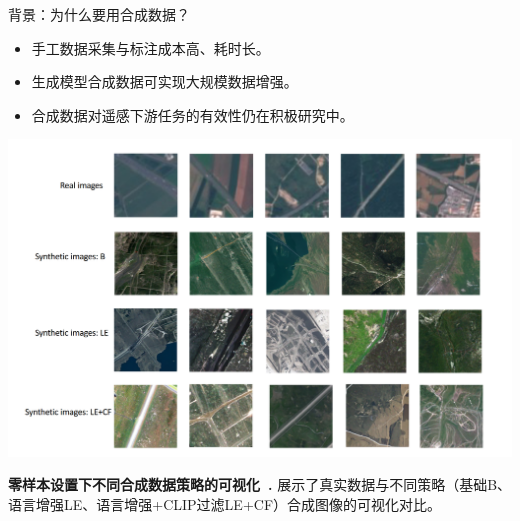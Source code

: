   
\begin{refsection}
  \begin{frame}{背景：为什么要用合成数据？}
    \begin{itemize}
      \item 手工数据采集与标注成本高、耗时长。
      \item 生成模型合成数据可实现大规模数据增强。
      \item 合成数据对遥感下游任务的有效性仍在积极研究中。
    \end{itemize}
    \begin{minipage}{0.5\linewidth}
      \includegraphics[width=\linewidth]{figs/Visualization_of_different_strategies_of_synthetic_data_in_zeroshot_settings.png}
    \end{minipage}%
    \hfill
    \begin{minipage}{0.4\linewidth}
      \vspace{0.5em}
      {\scriptsize
      \textbf{零样本设置下不同合成数据策略的可视化~\parencite{heSYNTHETICDATAGENERATIVE2022}.} 展示了真实数据与不同策略（基础B、语言增强LE、语言增强+CLIP过滤LE+CF）合成图像的可视化对比。
      }
    \end{minipage}
    \bottomleftrefs
  \end{frame}
  \end{refsection}
  
  
  
